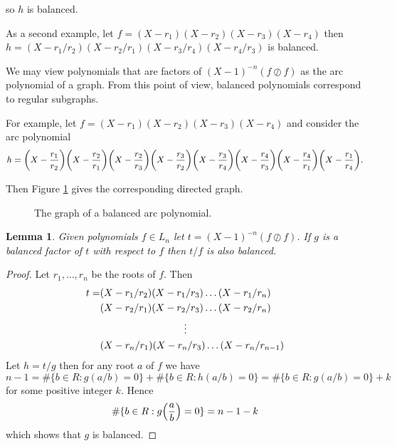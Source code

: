 \documentclass{article}
\let\originalleft\left
\let\originalright\right
\renewcommand{\left}{\mathopen{}\mathclose\bgroup\originalleft}
\renewcommand{\right}{\aftergroup\egroup\originalright}
\newcounter{dummy} \numberwithin{dummy}{section}
\theoremstyle{plain}
\newtheorem{lem}[dummy]{Lemma}
\theoremstyle{definition}
\begin{document}
		\noindent so $h$ is balanced. 
		
		As a second example, let $f=(X-r_1)(X-r_2)(X-r_3)(X-r_4)$ then $h=(X-r_1/r_2)(X-r_2/r_1)(X-r_3/r_4)(X-r_4/r_3)$ is balanced. 
		
		We may view polynomials that are factors of $(X-1)^{-n}(f \oslash f)$ as the arc polynomial of a graph. From this point of view, balanced polynomials correspond to regular subgraphs.
		
		For example, let $f=(X-r_1)(X-r_2)(X-r_3)(X-r_4)$ and consider the arc polynomial 
		\[ h=\left(X-\frac{r_1}{r_2} \right)\left(X-\frac{r_2}{r_1} \right)\left(X-\frac{r_2}{r_3} \right)\left(X-\frac{r_3}{r_2} \right)\left(X-\frac{r_3}{r_4} \right)\left(X-\frac{r_4}{r_3} \right)\left(X-\frac{r_4}{r_1} \right)\left(X-\frac{r_1}{r_4} \right). \]
		
		\noindent Then Figure \ref{FIG:ShitFig} gives the corresponding directed graph. 
		
		\begin{center}
		    \begin{figure} 
						 
				    \caption{The graph of a balanced arc polynomial.}
				    \label{FIG:ShitFig}  
				\end{figure}
		\end{center}	
		
		\begin{lem}
		\label{LEM:bal}
		    Given polynomials $f \in L_n$ let $t=(X-1)^{-n}(f \oslash f)$. If $g$ is a balanced factor of $t$ with respect to $f$ then $t/f$ is also balanced. 
		\end{lem}
		
		\begin{proof}
		    Let $r_1,\ldots,r_n$ be the roots of $f$. Then 
				\begin{alignat*}{2}
				    t =&(X-r_1/r_2)(X-r_1/r_3) \ldots (X-r_1/r_n)                \\
						   &(X-r_2/r_1)(X-r_2/r_3) \ldots (X-r_2/r_n)                \\
							 & \vdotswithin{(X-r_2/r_1)(X-r_2/r_3) \ldots (X-r_2/r_n)} \\
							 &(X-r_n/r_1)(X-r_n/r_3) \ldots (X-r_n/r_{n-1})            
				\end{alignat*}
				Let $h=t/g$ then for any root $a$ of $f$ we have 
				\[ n-1 = {\#} \{ b \in R : g(a/b)=0 \} + {\#} \{ b \in R : h(a/b)=0 \} = {\#} \{ b \in R : g(a/b)=0 \} + k \]
				\noindent for some positive integer $k$. Hence 
				\[ {\#} \{ b \in R : g\left( \frac{a}{b}\right)=0 \} = n-1-k \]
				\noindent which shows that $g$ is balanced. 
		\end{proof}
						
\end{document}
